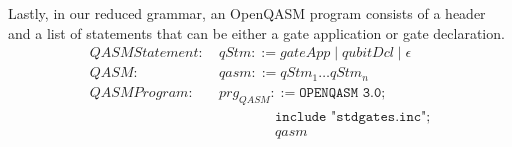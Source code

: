 Lastly, in our reduced grammar, an OpenQASM program consists of a header and a list of statements that can be either a gate application or gate declaration.
\begin{align*}
    QASMStatement: \ & qStm::= gateApp \mid qubitDcl \mid \epsilon\\
    QASM: \ & qasm ::= qStm_1 \dots qStm_n\\
    QASMProgram: \ & prg_{QASM} ::= \texttt{OPENQASM 3.0;}\\
            & \quad \quad \quad \quad \texttt{include "stdgates.inc";}\\
            & \quad \quad \quad \quad qasm
\end{align*}